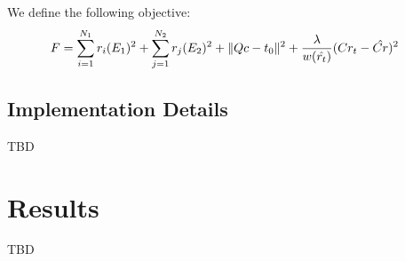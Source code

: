\documentclass[10pt]{article}         %
\DeclarePairedDelimiter\norm{\lVert}{\rVert}%
\begin{document}
We define the following objective:
\begin{align*}
  F &= \sum_{i=1}^{N_1}{ r_i(E_1)^2 } + \sum_{j=1}^{N_2}{ r_j(E_2)^2 }
  + \norm{Qc-t_0}^2 + \frac{\lambda}{w(\hat{r_t})}(Cr_t - \hat{Cr})^2
\end{align*}

\subsection{Implementation Details}
TBD

\section{Results}
TBD



\end{document}
